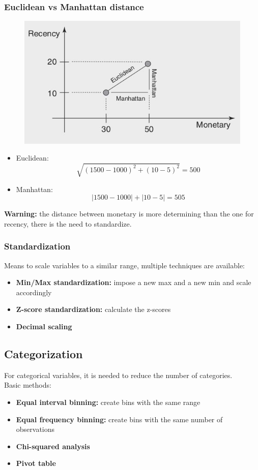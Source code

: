         \subsubsection{Euclidean vs Manhattan distance}
            \begin{figure}[ht!]
                \centering
                \includegraphics[width=0.6\linewidth]{lecture_13/distances.png}
            \end{figure}
            \begin{itemize}
                \item Euclidean: $$\sqrt{(1500-1000)^2 + (10-5)^2} = 500$$
                \item Manhattan: $$ |1500-1000| + |10-5| = 505$$
            \end{itemize}
            \textbf{Warning:} the distance between monetary is more determining than the one for recency, there is the need to standardize.
        \subsubsection{Standardization}
            Means to scale variables to a similar range, multiple techniques are available:
            \begin{itemize}
                \item \textbf{Min/Max standardization:} impose a new max and a new min and scale accordingly
                \item \textbf{Z-score standardization:} calculate the z-scores
                \item \textbf{Decimal scaling}
            \end{itemize}
    \subsection{Categorization}
        For categorical variables, it is needed to reduce the number of categories.\\
        Basic methods:
        \begin{itemize}
            \item \textbf{Equal interval binning:} create bins with the same range
            \item \textbf{Equal frequency binning:} create bins with the same number of observations
            \item \textbf{Chi-squared analysis}
            \item \textbf{Pivot table}
        \end{itemize}
